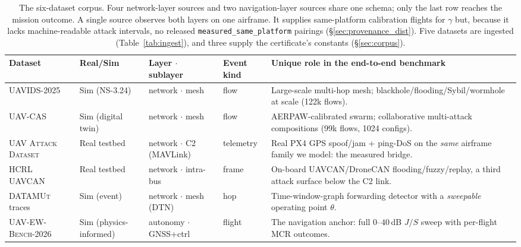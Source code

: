 \documentclass[conference,letterpaper,10pt]{IEEEtran}   %
\newif\ifanon
\newcommand{\ownbenchcite}{\ifanon\cite{uavewbench2026anon}\else\cite{uavewbench2026}\fi}
\newcommand{\layernet}{network}
\newcommand{\layerauto}{autonomy}
\newcommand{\dataset}[1]{\textsc{#1}}
\newcommand{\code}[1]{\texttt{#1}}
\begin{document}
\begin{table}[t]
\centering
\caption{The six-dataset corpus. Four network-layer sources and two
navigation-layer sources share one schema; only the last row reaches
the mission outcome. A single source observes both layers on one airframe. It
supplies same-platform calibration flights for $\gamma$ but, because it lacks
machine-readable attack intervals, no released \code{measured\_same\_platform}
pairings (\S\ref{sec:provenance_dist}). Five datasets are ingested
(Table~\ref{tab:ingest}), and three supply the certificate's constants
(\S\ref{sec:corpus}).}
\label{tab:corpus}
\footnotesize
\renewcommand{\arraystretch}{1.2}
\begin{tabularx}{\textwidth}{@{}l l l l X@{}}
\toprule
\textbf{Dataset} & \textbf{Real/Sim} & \textbf{Layer $\cdot$ sublayer} & \textbf{Event kind} & \textbf{Unique role in the end-to-end benchmark}\\
\midrule
\dataset{UAVIDS-2025}~\cite{uavids2025} & Sim (NS-3.24) & \layernet{} $\cdot$ mesh & flow & Large-scale multi-hop mesh; blackhole/flooding/Sybil/wormhole at scale (122k flows).\\
\dataset{UAV-CAS}~\cite{uavcas2026} & Sim (digital twin) & \layernet{} $\cdot$ mesh & flow & AERPAW-calibrated swarm; collaborative multi-attack compositions (99k flows, 1024 configs).\\
\dataset{UAV Attack Dataset}~\cite{whelan2020uav} & Real testbed & \layernet{} $\cdot$ C2 (MAVLink) & telemetry & Real PX4 GPS spoof/jam + ping-DoS on the \emph{same} airframe family we model: the measured bridge.\\
\dataset{HCRL UAVCAN}~\cite{hcrl_uavcan} & Real testbed & \layernet{} $\cdot$ intra-bus & frame & On-board UAVCAN/DroneCAN flooding/fuzzy/replay, a third attack surface below the C2 link.\\
\dataset{DATAMUt} traces~\cite{datamut2026} & Sim (event) & \layernet{} $\cdot$ mesh (DTN) & hop & Time-window-graph forwarding detector with a \emph{sweepable} operating point $\theta$.\\
\dataset{UAV-EW-Bench-2026}~\ownbenchcite & Sim (physics-informed) & \layerauto{} $\cdot$ GNSS+ctrl & flight & The navigation anchor: full $0$--$40$\,dB $J/S$ sweep with per-flight MCR outcomes.\\
\bottomrule
\end{tabularx}
\end{table}
\end{document}

